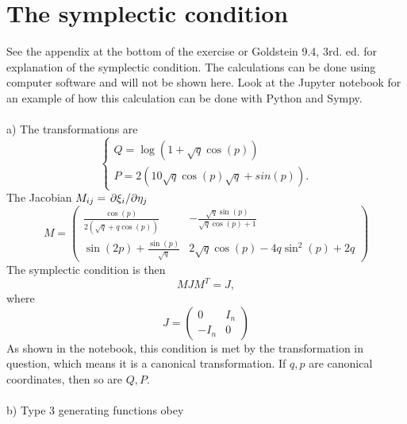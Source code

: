 \documentclass{article}
\begin{document}
    \section{The symplectic condition}
    See the appendix at the bottom of the exercise or Goldstein 9.4, 3rd. ed. for explanation of the symplectic condition. The calculations can be done using computer software and will not be shown here. Look at the Jupyter notebook for an example of how this calculation can be done with Python and Sympy. \\ \\
    a) The transformations are
    \begin{equation*}
        \begin{cases}
            Q = \log(1 + \sqrt q \cos(p)) \\
            P = 2(1 0 \sqrt q \cos(p)\sqrt q +sin(p)).
        \end{cases}    
    \end{equation*}
    The Jacobian $M_{ij} = \pdv*{\xi_i}{\eta_j}$
    \begin{equation*}
        M =  \left(
            \begin{matrix}
                \frac{\cos{\left(p \right)}}{2 \left(\sqrt{q} + q \cos{\left(p \right)}\right)} 
                & - \frac{\sqrt{q} \sin{\left(p \right)}}{\sqrt{q} \cos{\left(p \right)} + 1}\\
                \sin{\left(2 p \right)} + \frac{\sin{\left(p \right)}}{\sqrt{q}} 
                & 2 \sqrt{q} \cos{\left(p \right)} - 4 q \sin^{2}{\left(p \right)} + 2 q
            \end{matrix}\right)
    \end{equation*}
    The symplectic condition is then 
    \begin{equation*}
        M J M^T = J,
    \end{equation*}
    where 
    \begin{equation*}
        J = 
        \begin{pmatrix*}
            0 & I_n \\
            -I_n & 0
        \end{pmatrix*}
    \end{equation*}
    As shown in the notebook, this condition is met by the transformation in question, which means it is a canonical transformation. If $q, p$ are canonical coordinates, then so are $Q, P$. \\ \\
    b) Type 3 generating functions obey
\end{document}
